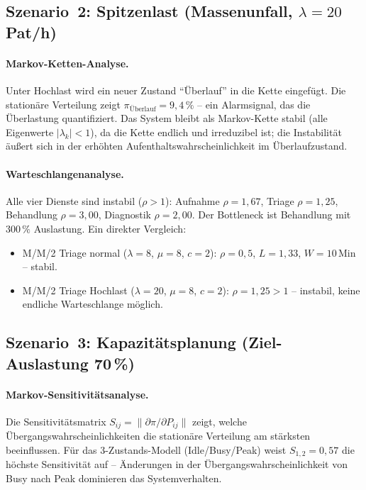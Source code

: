 ﻿\documentclass[a4paper,12pt]{report}
\theoremstyle{definition}
\begin{document}
\subsection{Szenario~2: Spitzenlast (Massenunfall, $\lambda = 20$\,Pat/h)}

\paragraph{Markov-Ketten-Analyse.}
Unter Hochlast wird ein neuer Zustand ``Überlauf'' in die Kette eingefügt.
Die stationäre Verteilung zeigt $\pi_\text{Überlauf} = 9{,}4\,\%$ --
ein Alarmsignal, das die Überlastung quantifiziert. Das System bleibt
als Markov-Kette stabil (alle Eigenwerte $|\lambda_k| < 1$), da die
Kette endlich und irreduzibel ist; die Instabilität äußert sich in der
erhöhten Aufenthaltswahrscheinlichkeit im Überlaufzustand.

\paragraph{Warteschlangenanalyse.}
Alle vier Dienste sind instabil ($\rho > 1$): Aufnahme $\rho = 1{,}67$,
Triage $\rho = 1{,}25$, Behandlung $\rho = 3{,}00$, Diagnostik $\rho = 2{,}00$.
Der Bottleneck ist Behandlung mit $300\,\%$ Auslastung. Ein direkter Vergleich:
\begin{itemize}
	\item[-] M/M/2 Triage normal ($\lambda=8$, $\mu=8$, $c=2$):
	$\rho = 0{,}5$, $L = 1{,}33$, $W = 10$\,Min -- stabil.
	\item[-] M/M/2 Triage Hochlast ($\lambda=20$, $\mu=8$, $c=2$):
	$\rho = 1{,}25 > 1$ -- instabil, keine endliche Warteschlange möglich.
\end{itemize}

\subsection{Szenario~3: Kapazitätsplanung (Ziel-Auslastung 70\,\%)}

\paragraph{Markov-Sensitivitätsanalyse.}
Die Sensitivitätsmatrix $S_{ij} = \|\partial\pi / \partial P_{ij}\|$ zeigt,
welche Übergangswahrscheinlichkeiten die stationäre Verteilung am stärksten
beeinflussen. Für das 3-Zustands-Modell (Idle/Busy/Peak) weist
$S_{1,2} = 0{,}57$ die höchste Sensitivität auf -- Änderungen in der
Übergangswahrscheinlichkeit von Busy nach Peak dominieren das Systemverhalten.
\end{document}
